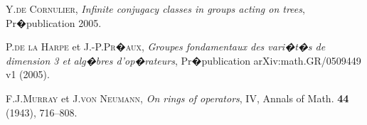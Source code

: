 \documentclass[12pt,oneside]{amsart}
\begin{document}
\begin{comment}
\end{comment}


\begin{thebibliography}{mot}

Y.\textsc{de Cornulier}, \emph{Infinite conjugacy classes in
groups acting on trees}, Pr�publication 2005.


P.\textsc{de la Harpe} et J.-P.\textsc{Pr�aux}, \emph{Groupes
fondamentaux des vari�t�s de dimension 3 et alg�bres
d'op�rateurs}, Pr�publication arXiv:math.GR/0509449 v1 (2005).


F.J.\textsc{Murray} et J.\textsc{von Neumann}, \emph{On rings of
operators}, IV, Annals of Math. {\bf 44} (1943), 716--808.

\end{thebibliography}


 
\end{document}
